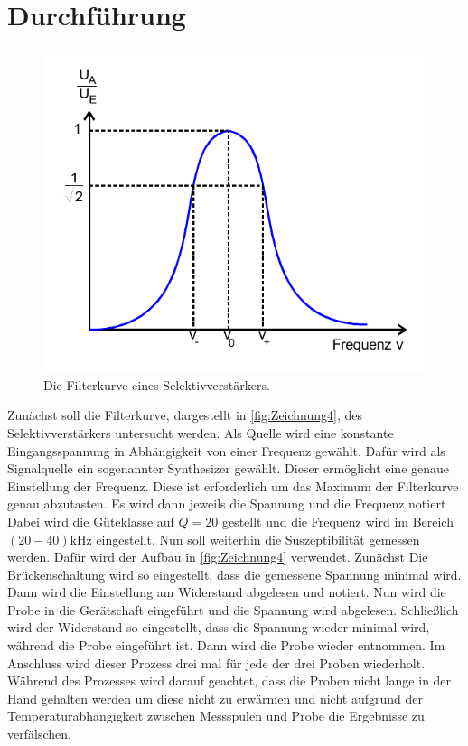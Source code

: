 \section{Durchführung}
\label{sec:Durchführung}
\begin{figure}
    \centering
    \includegraphics[width=0.8\linewidth]{pictures/Zeichnung3.pdf}
    \caption{Die Filterkurve eines Selektivverstärkers. \cite{v606}}
    \label{fig:Zeichnung3}
\end{figure}
Zunächst soll die Filterkurve, dargestellt in \autoref{fig:Zeichnung4}, des Selektivverstärkers untersucht werden.
Als Quelle wird eine konstante Eingangsspannung in Abhängigkeit von einer Frequenz gewählt.
Dafür wird als Signalquelle ein sogenannter Synthesizer gewählt.
Dieser ermöglicht eine genaue Einstellung der Frequenz.
Diese ist erforderlich um das Maximum der Filterkurve genau abzutasten.
Es wird dann jeweils die Spannung und die Frequenz notiert
Dabei wird die Güteklasse auf $Q = 20$ gestellt und die Frequenz wird im Bereich $(20 - 40) \unit{\kilo\hertz}$ eingestellt.
Nun soll weiterhin die Suszeptibilität gemessen werden.
Dafür wird der Aufbau in \autoref{fig:Zeichnung4} verwendet.
Zunächst 
Die Brückenschaltung wird so eingestellt, dass die gemessene Spannung minimal wird.
Dann wird die Einstellung am Widerstand abgelesen und notiert.
Nun wird die Probe in die Gerätschaft eingeführt und die Spannung wird abgelesen.
Schließlich wird der Widerstand so eingestellt, dass die Spannung wieder minimal wird, während die Probe eingeführt ist.
Dann wird die Probe wieder entnommen.
Im Anschluss wird dieser Prozess drei mal für jede der drei Proben wiederholt.
Während des Prozesses wird darauf geachtet, dass die Proben nicht lange in der Hand gehalten werden um diese nicht zu erwärmen
und nicht aufgrund der Temperaturabhängigkeit zwischen Messspulen und Probe die Ergebnisse zu verfälschen.

